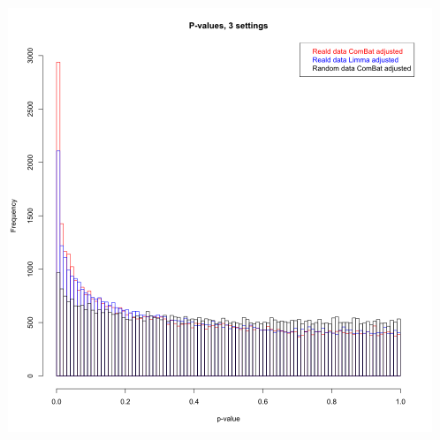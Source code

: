 \documentclass{bio}
\begin{document}
\begin{figure}[!p]
\centering\includegraphics[width=13cm]{Fig/pvaluesjohnson2.png}
\caption{
}
\label{fig:pdist-johnson}
\end{figure}


\end{document}
